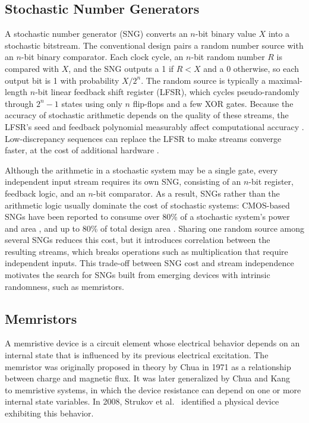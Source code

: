 \documentclass[conference]{IEEEtran}
\begin{document}
\subsection{Stochastic Number Generators}
A stochastic number generator (SNG) converts an $n$-bit binary value $X$ into
a stochastic bitstream. The conventional design pairs a random number source
with an $n$-bit binary comparator. Each clock cycle, an $n$-bit random number
$R$ is compared with $X$, and the SNG outputs a 1 if $R < X$ and a 0
otherwise, so each output bit is 1 with probability $X/2^n$. The random
source is typically a maximal-length $n$-bit linear feedback shift register
(LFSR), which cycles pseudo-randomly through $2^n - 1$ states using only $n$
flip-flops and a few XOR gates. Because the accuracy of stochastic arithmetic
depends on the quality of these streams, the LFSR's seed and feedback
polynomial measurably affect computational accuracy \cite{LFSR_seeding}.
Low-discrepancy sequences can replace the LFSR to make streams converge
faster, at the cost of additional hardware \cite{low_discrepancy}.

Although the arithmetic in a stochastic system may be a single gate, every
independent input stream requires its own SNG, consisting of an $n$-bit
register, feedback logic, and an $n$-bit comparator. As a result, SNGs rather
than the arithmetic logic usually dominate the cost of stochastic systems:
CMOS-based SNGs have been reported to consume over 80\% of a stochastic
system's power and area \cite{sng_cost_reram}, and up to 80\% of total design
area \cite{scrimp}. Sharing one random source among several SNGs reduces this
cost, but it introduces correlation between the resulting streams, which
breaks operations such as multiplication that require independent inputs.
This trade-off between SNG cost and stream independence motivates the search
for SNGs built from emerging devices with intrinsic randomness, such as
memristors.

\subsection{Memristors}

A memristive device is a circuit element whose electrical behavior depends on an 
internal state that is influenced by its previous electrical excitation. The 
memristor was originally proposed in theory by Chua in 1971 \cite{chua1971memristor}
as a relationship between charge and magnetic flux. It was later generalized by Chua and Kang~\cite{chua1976memristive} to
memristive systems, in which the device resistance can depend on one or more internal
state variables. In 2008, Strukov et al.~\cite{Strukov2008} identified a physical
device exhibiting this behavior.
\end{document}
